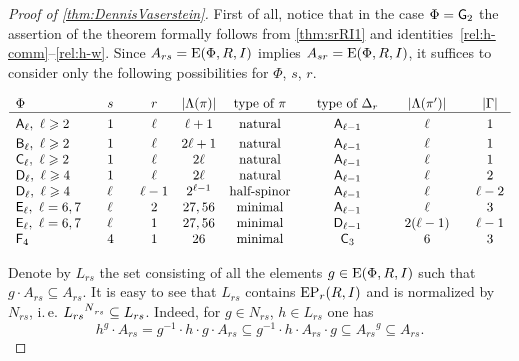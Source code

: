\begin{proof}[Proof of \cref{thm:DennisVaserstein}]
First of all, notice that in the case $\Phi=\mathsf{G}_2$ the assertion of the theorem formally follows from \cref{thm:srRI1} and identities~\ref{rel:h-comm}--\ref{rel:h-w}.
Since $A_{rs} = \operatorname{E}(\Phi, R, I)$ implies $A_{sr} = \operatorname{E}(\Phi, R, I)$, it suffices to consider only the following possibilities for $\Phi$, $s$, $r$.
\begin{table}[htb]
\[\begin{array}{l @{\qquad} l @{\qquad} c @{\quad} c @{\quad} c @{\qquad} c @{\qquad} c @{\qquad} c}
\Phi                                 & s    &r      & |\Lambda(\pi)| & \text{type of $\pi$} & \text{type of $\Delta_r$} & |\Lambda(\pi')|& |\Gamma|  \\ \hline\vphantom{\Bigl(}
\rA_\ell,\ \ell\geqslant 2           & 1    &\ell   & \ell+1         & \text{natural}       & \rA_{\ell-1}              & \ell           & 1  \\     
\rB_\ell,\ \ell\geqslant 2           & 1    &\ell   & 2\ell+1        & \text{natural}       & \rA_{\ell-1}              & \ell           & 1  \\     
\rC_\ell,\ \ell\geqslant 2           & 1    &\ell   & 2\ell          & \text{natural}       & \rA_{\ell-1}              & \ell           & 1  \\
\rD_\ell,\ \ell\geqslant 4           & 1    &\ell   & 2\ell          & \text{natural}       & \rA_{\ell-1}              & \ell           & 2  \\ 
\rD_\ell,\ \ell\geqslant 4           & \ell &\ell-1 & 2^{\ell-1}     & \text{half-spinor}   & \rA_{\ell-1}              & \ell           & \ell-2  \\
\rE_\ell,\ \ell=6,7                  & \ell &2      & 27, 56         & \text{minimal}       & \rA_{\ell-1}              & \ell           & 3       \\ 
\rE_\ell,\ \ell=6,7                  & \ell &1      & 27, 56         & \text{minimal}       & \rD_{\ell-1}              & 2(\ell-1)      & \ell-1  \\
\rF_4                                & 4    &1     & 26             & \text{minimal}       & \rC_3                     & 6              & 3\end{array}\]
 \caption{List of the cases considered in the proof of \cref{thm:DennisVaserstein}.} \label{table:dv-reps}
\end{table}

Denote by $L_{rs}$ the set consisting of all the elements $g\in \operatorname{E}(\Phi, R, I)$ such that $g \cdot A_{rs} \subseteq A_{rs}$.
It is easy to see that $L_{rs}$ contains $\operatorname{EP}_r(R, I)$ and is normalized by $N_{rs}$, i.\,e. ${L_{rs}}^{N\ssub{rs}}\subseteq L_{rs}$. Indeed, for $g\in N_{rs}$, $h\in L_{rs}$ one has
\begin{equation}\label{rel:NnormL} h^g \cdot A_{rs} = g^{-1} \cdot h \cdot g \cdot A_{rs} \subseteq g^{-1} \cdot h \cdot A_{rs} \cdot g \subseteq {A_{rs}}^g \subseteq A_{rs}.\end{equation}


\end{proof}
